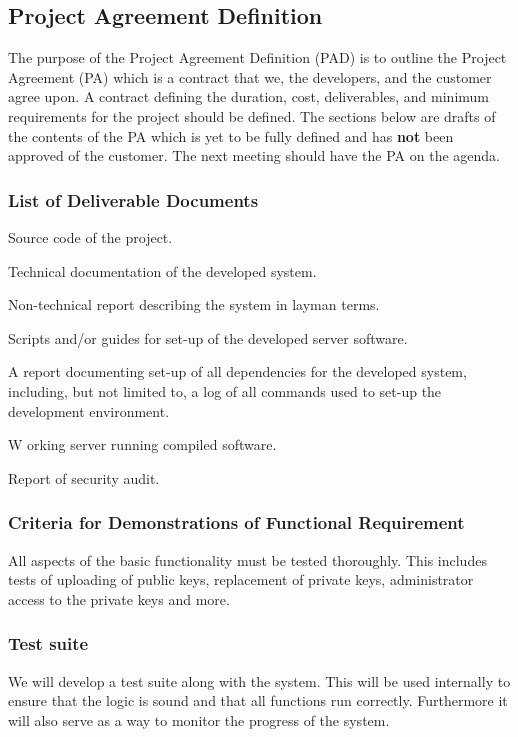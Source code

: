 \documentclass[11pt,a4paper]{report}
\let\OldItem\item
\newcommand{\SubItemStart}[1]{%
    \let\item\SubItemEnd
    \begin{SubItemList}[resume]%
        \OldItem #1%
}
\newcommand{\SubItemMiddle}[1]{%
    \OldItem #1%
}
\newcommand{\SubItemEnd}[1]{%
    \end{SubItemList}%
    \let\item\OldItem
    \item #1%
}
\newcommand*{\SubItem}[1]{%
    \let\SubItem\SubItemMiddle%
    \SubItemStart{#1}%
}%
\begin{document}
\subsection{Project Agreement Definition}
The purpose of the Project Agreement Definition (PAD) is to outline the Project Agreement (PA) which is a contract that we, the developers, and the customer agree upon. A contract defining the duration, cost, deliverables, and minimum requirements for the project should be defined. The sections below are drafts of the contents of the PA which is yet to be fully defined and has \textbf{not} been approved of the customer. The next meeting should have the PA on the agenda.
\subsubsection{List of Deliverable Documents}\label{sec:deliverables}
\begin{itemize}
\item Source code of the project.
\item Technical documentation of the developed system.
\item Non-technical report describing the system in layman terms.
\item Scripts and/or guides for set-up of the developed server software.
\SubItem A report documenting set-up of all dependencies for the developed system, including, but not limited to, a log of all commands used to set-up the development environment.
\item Working server running compiled software.
\item Report of security audit.
\end{itemize}
\subsubsection{Criteria for Demonstrations of Functional Requirement}
All aspects of the basic functionality must be tested thoroughly. This includes tests of uploading of public keys, replacement of private keys, administrator access to the private keys and more.

\subsubsection{Test suite}

We will develop a test suite along with the system. This will be used internally to ensure that the logic is sound and that all functions run correctly. Furthermore it will also serve as a way to monitor the progress of the system.
\end{document}
